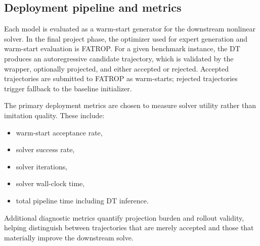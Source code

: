 \begin{table}[t]
\centering
\caption{Representative training progression across the main DT variants. Validation loss is the best logged value for each checkpoint.}
\label{tab:training_summary}
\setlength{\tabcolsep}{4pt}
\small
{}
\end{table}

\subsection{Deployment pipeline and metrics}

Each model is evaluated as a warm-start generator for the downstream nonlinear solver. In the final project phase, the optimizer used for expert generation and warm-start evaluation is FATROP. For a given benchmark instance, the DT produces an autoregressive candidate trajectory, which is validated by the wrapper, optionally projected, and either accepted or rejected. Accepted trajectories are submitted to FATROP as warm-starts; rejected trajectories trigger fallback to the baseline initializer.

The primary deployment metrics are chosen to measure solver utility rather than imitation quality. These include:
\begin{itemize}
    \item warm-start acceptance rate,
    \item solver success rate,
    \item solver iterations,
    \item solver wall-clock time,
    \item total pipeline time including DT inference.
\end{itemize}
Additional diagnostic metrics quantify projection burden and rollout validity, helping distinguish between trajectories that are merely accepted and those that materially improve the downstream solve.

